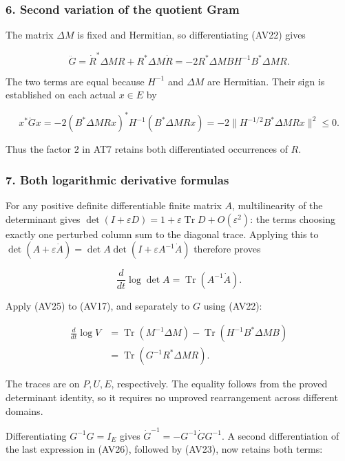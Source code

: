 \documentclass{article}
\begin{document}
\subsubsection{6. Second variation of the quotient Gram}\label{endpoint-variation_review--second-variation-of-the-quotient-gram}

The matrix \(\Delta M\) is fixed and Hermitian, so differentiating (AV22) gives

\[
\ddot G=\dot R^*\Delta M R+R^*\Delta M\dot R
=-2R^*\Delta M BH^{-1}B^*\Delta M R.
\tag{AV23}
\]

The two terms are equal because \(H^{-1}\) and \(\Delta M\) are Hermitian. Their sign is established on each actual \(x\in E\) by

\[
x^*\ddot Gx
=-2(B^*\Delta M Rx)^*H^{-1}(B^*\Delta M Rx)
=-2\|H^{-1/2}B^*\Delta M Rx\|^2\le0.
\tag{AV24}
\]

Thus the factor \(2\) in AT7 retains both differentiated occurrences of \(R\).

\subsubsection{7. Both logarithmic derivative formulas}\label{endpoint-variation_review--both-logarithmic-derivative-formulas}

For any positive definite differentiable finite matrix \(A\), multilinearity of the determinant gives \(\det(I+\varepsilon D)=1+\varepsilon\operatorname{Tr}D+O(\varepsilon^2)\): the terms choosing exactly one perturbed column sum to the diagonal trace. Applying this to \(\det(A+\varepsilon\dot A)=\det A\det(I+\varepsilon A^{-1}\dot A)\) therefore proves

\[
\frac{d}{dt}\log\det A=\operatorname{Tr}(A^{-1}\dot A).
\tag{AV25}
\]

Apply (AV25) to (AV17), and separately to \(G\) using (AV22):

\[
\begin{aligned}
\frac{d}{dt}\log V
&=\operatorname{Tr}(M^{-1}\Delta M)
-\operatorname{Tr}(H^{-1}B^*\Delta M B)\\
&=\operatorname{Tr}(G^{-1}R^*\Delta M R).
\end{aligned}
\tag{AV26}
\]

The traces are on \(P,U,E\), respectively. The equality follows from the proved determinant identity, so it requires no unproved rearrangement across different domains.

Differentiating \(G^{-1}G=I_E\) gives \(\dot G^{-1}=-G^{-1}\dot G G^{-1}\). A second differentiation of the last expression in (AV26), followed by (AV23), now retains both terms:
\end{document}
